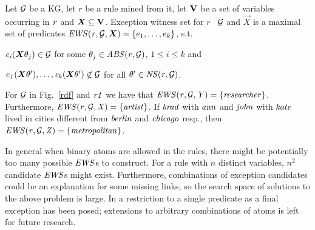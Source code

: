\begin{definition} \label{def:ews}
Let $\mathcal{G}$ be a KG, let $r$ be a rule mined from it, let ${\mathbf V}$ be a set of variables occurring in $\mathit{r}$ and $\vec{X}\subseteq \cV$. Exception witness set for $r$ \wrt\ $\mathcal{G}$ and $\vec{X}$ is a maximal set of predicates $\mi{EWS(r,\cG,\vec{X})}=\{e_1,\dotsc,e_k\}$, s.t.
\begin{myitemize}
\item $\mi{e_i}(\vec{X}\theta_j)\in \cG$ for some $\theta_j\in \mathit{ABS(r,\mathcal{G})}$, $1 \leq i\leq k$ and
\item $\mi{e_1}(\vec{X}\theta'),\dotsc,\mi{e_k}(\vec{X}\theta')\not \in \cG$ for all $\theta' \in \mathit{NS(r,\mathcal{G})}$.
\end{myitemize}
\end{definition}

\begin{example}
For $\mathcal{G}$ in Fig.~\ref{rdf} and $\mathit{r1}$ 
we have that $\mathit{EWS(r,\mathcal{G},Y)}=\{\mathit{researcher}\}$. Furthermore,
 $\mathit{EWS(r,\mathcal{G},X)}=\{\mathit{artist}\}$. If $\mathit{brad}$ with $\mathit{ann}$ and $\mathit{john}$ with $\mathit{kate}$ lived in cities different from $\mathit{berlin}$ and $\mathit{chicago}$ resp., then $\mathit{EWS(r,\mathcal{G},Z)}=\{\mathit{metropolitan}\}$. 
\end{example}
In general when binary atoms are allowed in the rules, there might be potentially too many possible $\mathit{EWS}$s to construct. 
For a rule with $n$ distinct variables, $n^2$ candidate $\mathit{EWS}$s might exist. Furthermore, combinations of exception candidates could be an explanation for some missing links, so the search space of solutions to the above problem is large. In \cite{rumis} a restriction to a single predicate as a final exception has been posed; extensions to arbitrary combinations of atoms is left for future research.





